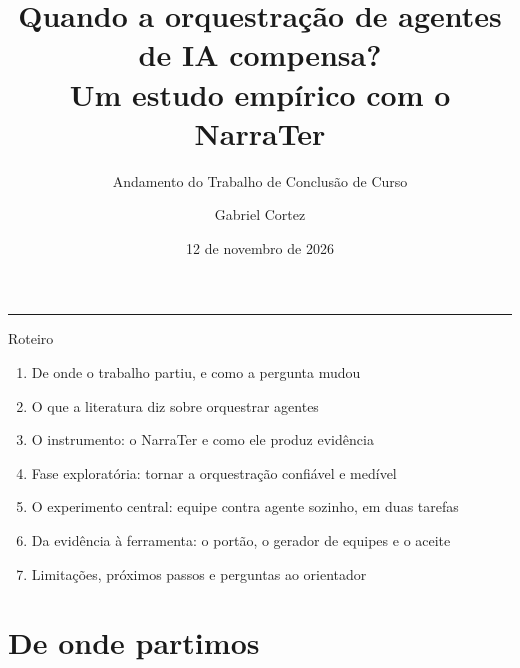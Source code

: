 \documentclass[11pt,aspectratio=169]{beamer}
\title{Quando a orquestração de agentes de IA compensa?\\[2pt]{\Large Um estudo empírico com o NarraTer}}
\subtitle{Andamento do Trabalho de Conclusão de Curso}
\author{Gabriel Cortez}
\date{12 de novembro de 2026}
\begin{document}
\begin{frame}[plain]
\vfill
{\color{acento}\rule{3em}{3pt}}\par\vspace{0.8em}
{\inserttitle\par}
\vspace{0.6em}{\large\color{suave}\insertsubtitle\par}
\vspace{1.6em}
{\insertauthor\par}
{\small\color{suave}\insertdate\par}
\vfill
\end{frame}

\begin{frame}{Roteiro}
\begin{enumerate}
\setlength\itemsep{0.45em}
\item De onde o trabalho partiu, e como a pergunta mudou
\item O que a literatura diz sobre orquestrar agentes
\item O instrumento: o NarraTer e como ele produz evidência
\item Fase exploratória: tornar a orquestração confiável e medível
\item O experimento central: equipe contra agente sozinho, em duas tarefas
\item Da evidência à ferramenta: o portão, o gerador de equipes e o aceite
\item Limitações, próximos passos e perguntas ao orientador
\end{enumerate}
\end{frame}

\section{De onde partimos}
\end{document}
